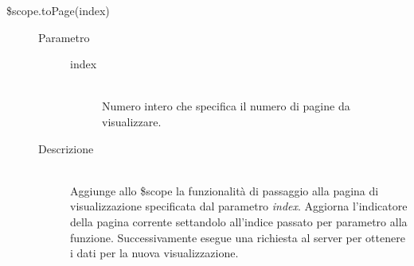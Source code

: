 \begin{description}
\begin{description}
  \item[\$scope.toPage(index)] \hfill
  \begin{description}
  	\item[Parametro] \hfill
  	\begin{description}
  		\item[index] \hfill \\
  		Numero intero che specifica il numero di pagine da visualizzare.
  	\end{description}
  	\item[Descrizione] \hfill \\
  	Aggiunge allo \$scope la funzionalità di passaggio alla pagina di visualizzazione specificata dal parametro \textit{index}.
  Aggiorna l'indicatore della pagina corrente settandolo all'indice passato per parametro alla funzione.
  Successivamente esegue una richiesta al server per ottenere i dati per la nuova visualizzazione.
  \end{description}
 \end{description}
\end{description}


